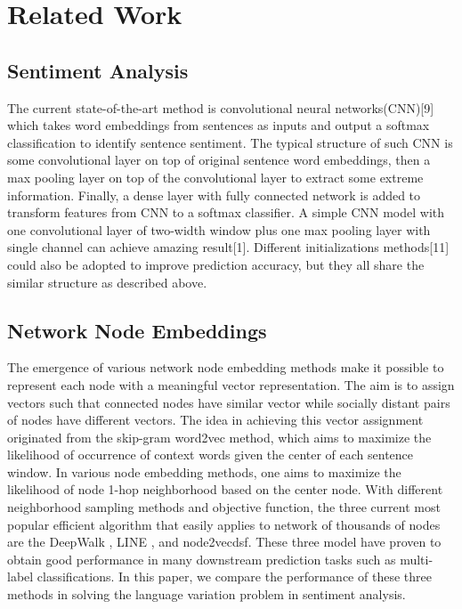 \section{Related Work}

\subsection*{Sentiment Analysis}

The current state-of-the-art method is convolutional neural networks(CNN)[9] which takes word embeddings from sentences as inputs and output a softmax classification to identify sentence sentiment. The typical structure of such CNN is some convolutional layer on top of original sentence word embeddings, then a max pooling layer on top of the convolutional layer to extract some extreme information.  Finally, a dense layer with fully connected network is added to transform features from CNN to a softmax classifier. A simple CNN model with one convolutional layer of two-width window plus one max pooling layer with single channel can achieve amazing result[1]. Different initializations methods[11] could also be adopted to improve prediction accuracy, but they all share the similar structure as described above.


\subsection*{Network Node Embeddings}
The emergence of various network node embedding methods make it possible to represent each node with a meaningful
vector representation. The aim is to assign vectors such that connected nodes have similar vector while
socially distant pairs of nodes have different vectors. The idea in achieving this vector assignment originated
from the skip-gram word2vec method, which aims to maximize the likelihood of occurrence of context words given
the center of each sentence window. In various node embedding methods, one aims to maximize the likelihood
of node 1-hop neighborhood based on the center node. With different neighborhood sampling methods and objective function,
the three current most popular efficient algorithm that easily applies to network of thousands of nodes are the 
DeepWalk \cite{sdf}, LINE \cite{sdfsd}, and node2vec{dsf}. These three model have proven to obtain good performance
in many downstream prediction tasks such as multi-label classifications. In this paper, we compare the performance
of these three methods in solving the language variation problem in sentiment analysis. 



